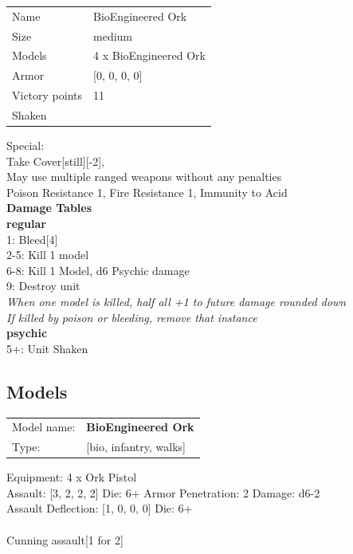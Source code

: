 \begin{tabular}{ll}
  Name & BioEngineered Ork \\
  Size & medium\\
  Models & 4 x BioEngineered Ork\\
  Armor & [0, 0, 0, 0]\\
  Victory points & 11\\
  Shaken & \\
\end{tabular}
Special: \\
Take Cover[still][-2], \\
May use multiple ranged weapons without any penalties\\ 
Poison Resistance 1, Fire Resistance 1, Immunity to Acid\\ 



{\bf Damage Tables} \\
 {\bf regular } \\
1: Bleed[4] \\
2-5: Kill 1 model \\
6-8: Kill 1 Model, d6 Psychic damage \\
9: Destroy unit \\
{{\it When one model is killed, half all +1 to future damage rounded down}} \\
{{\it If killed by poison or bleeding, remove that instance}} \\
 {\bf psychic } \\
5+: Unit Shaken \\


\clearpage

\subsection{ Models }

\begin{tabular}{ll}
Model name: & {\bf BioEngineered Ork } \\
Type: & [bio, infantry, walks] \\
\end{tabular}

Equipment: 4 x Ork Pistol \\

Assault: [3, 2, 2, 2] Die: 6+ Armor Penetration: 2 Damage: d6-2 \\
Assault Deflection: [1, 0, 0, 0] Die: 6+\\
\\ 
Cunning assault[1 for 2]\\ 
 



